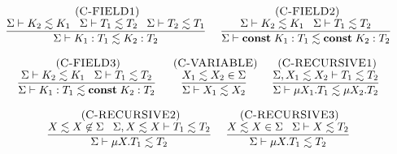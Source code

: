 \begin{figure}[!ht]
\begin{footnotesize}
$$\begin{array}{c}
\begin{array}{c}
\end{array}
\\ \\
\begin{array}{c}
\mylabel{C-FIELD1}\\
\dfrac{\senv \vdash K_{2} \lesssim K_{1} \;\;\;
       \senv \vdash T_{1} \lesssim T_{2} \;\;\;
       \senv \vdash T_{2} \lesssim T_{1}}
      {\senv \vdash K_{1}:T_{1} \lesssim K_{2}:T_{2}}
\end{array}
\;
\begin{array}{c}
\mylabel{C-FIELD2}\\
\dfrac{\senv \vdash K_{2} \lesssim K_{1} \;\;\;
       \senv \vdash T_{1} \lesssim T_{2}}
      {\senv \vdash \Const \; K_{1}:T_{1} \lesssim \Const \; K_{2}:T_{2}}
\end{array}
\\ \\
\begin{array}{c}
\mylabel{C-FIELD3}\\
\dfrac{\senv \vdash K_{2} \lesssim K_{1} \;\;\;
       \senv \vdash T_{1} \lesssim T_{2}}
      {\senv \vdash K_{1}:T_{1} \lesssim \Const \; K_{2}:T_{2}}
\end{array}
\;
\begin{array}{c}
\mylabel{C-VARIABLE}\\
\dfrac{X_{1} \lesssim X_{2} \in \senv}
      {\senv \vdash X_{1} \lesssim X_{2}}
\end{array}
\;
\begin{array}{c}
\mylabel{C-RECURSIVE1}\\
\dfrac{\senv, X_{1} \lesssim X_{2} \vdash T_{1} \lesssim T_{2}}
      {\senv \vdash \mu X_{1}.T_{1} \lesssim \mu X_{2}.T_{2}}
\end{array}
\\ \\
\begin{array}{c}
\mylabel{C-RECURSIVE2}\\
\dfrac{X \lesssim X \not\in \senv \;\;\;
      \senv, X \lesssim X \vdash T_{1} \lesssim T_{2}}
      {\senv \vdash \mu X.T_{1} \lesssim T_{2}}
\end{array}
\;
\begin{array}{c}
\mylabel{C-RECURSIVE3}\\
\dfrac{X \lesssim X \in \senv \;\;\;
       \senv \vdash X \lesssim T_{2}}
      {\senv \vdash \mu X.T_{1} \lesssim T_{2}}
\end{array}
\\ \\
\begin{array}{c}

\end{array}
\end{array}$$
\end{footnotesize}
\end{figure}
